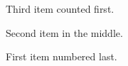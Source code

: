 \documentclass{article}
\begin{document}
\begin{etaremune}
\item Third item counted first.
\item Second item in the middle.
\item First item numbered last.
\end{etaremune}
\end{document}
